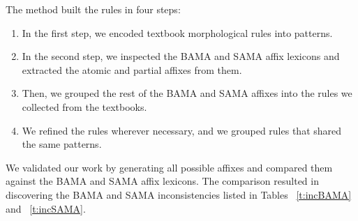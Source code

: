 The method built the rules in four steps: 
\begin{enumerate}
    \item In the first step, we encoded textbook morphological rules into patterns.
    \item In the second step, we inspected the BAMA and SAMA affix lexicons and extracted the atomic and partial affixes from them.
    \item Then, we grouped the rest of the BAMA and SAMA affixes into the rules we collected from the textbooks. 
    \item We refined the rules wherever necessary, and we grouped rules that shared the same patterns. 
\end{enumerate}

We validated our work by generating all possible affixes and compared them against the BAMA and SAMA affix lexicons. 
The comparison resulted in discovering the BAMA and SAMA inconsistencies listed in Tables ~\ref{t:incBAMA} and ~\ref{t:incSAMA}.
